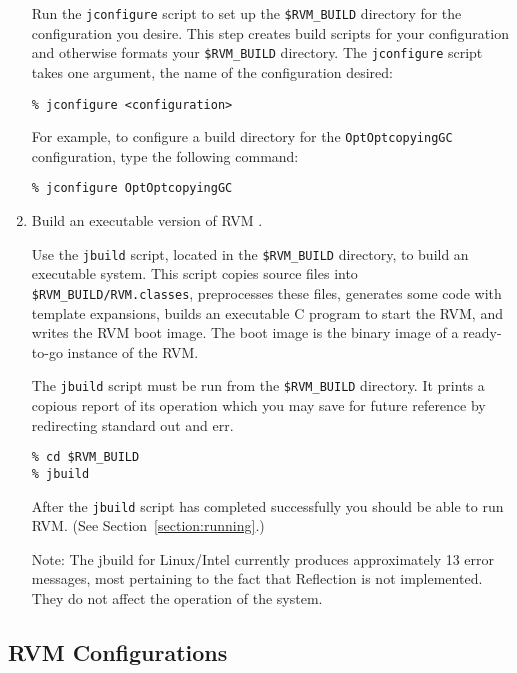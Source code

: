 \begin{enumerate}
Run the {\tt jconfigure} script to set up the {\tt \$RVM\_BUILD}
directory for the configuration you desire.  This step creates
build scripts for your configuration and otherwise formats your
{\tt \$RVM\_BUILD} directory.
The {\tt jconfigure} script takes one argument, the name of the
configuration desired: 

\begin{verbatim}
% jconfigure <configuration>
\end{verbatim}

For example, to configure a build 
directory for the {\tt OptOptcopyingGC} configuration, type
the following command:

\begin{verbatim}
% jconfigure OptOptcopyingGC
\end{verbatim}

\item Build an executable version of RVM .  

Use the {\tt jbuild} script, located in the {\tt \$RVM\_BUILD} directory,
to build an executable system.  This script copies source files into
{\tt \$RVM\_BUILD/RVM.classes}, preprocesses these files, generates
some code with template expansions, builds an executable C program to
start the RVM, and writes the RVM boot image.  The boot image is the
binary image of a ready-to-go instance of the RVM.

The {\tt jbuild} script must be run from the {\tt \$RVM\_BUILD}
directory. It prints a copious report of its operation which you may
save for future reference by redirecting standard out and err.

\begin{verbatim}
% cd $RVM_BUILD
% jbuild
\end{verbatim}


After the {\tt jbuild} script has completed successfully you should be able 
to run RVM.  (See Section~\ref{section:running}.)

Note: The jbuild for Linux/Intel currently produces approximately 13 error
messages, most pertaining to the fact that Reflection is not implemented.
They do not affect the operation of the system.

\end{enumerate}

\subsection{RVM Configurations}\label{configs}

